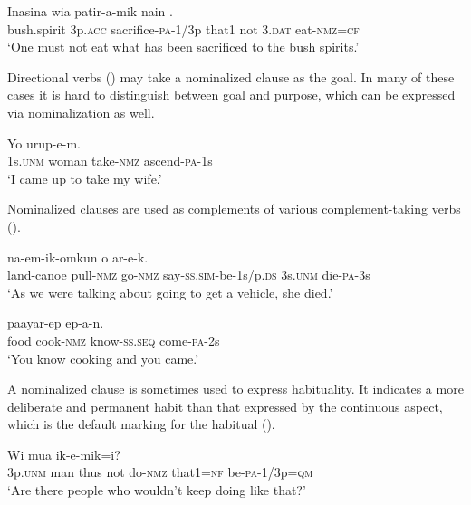 \ea%
\label{ex:5:x1244}
\gll Inasina  wia  patir-a-mik  nain    . \\
     bush.spirit  3p.\textsc{acc}  sacrifice-\textsc{pa}-1/3p  that1  not  3.\textsc{dat} eat-\textsc{nmz}=\textsc{cf} \\
\glt `One must not eat what has been sacrificed to the bush spirits.'
\z

Directional verbs () may take a nominalized clause as the goal. In many of these cases it is hard to distinguish between goal and purpose, which can be expressed via nominalization as well.

\ea%
\label{ex:5:x1245}
\gll Yo     urup-e-m. \\
     1s.\textsc{unm}  woman  take-\textsc{nmz}  ascend-\textsc{pa}-1s \\
\glt `I came up to take my wife.'
\z

Nominalized clauses are used as complements of various complement-taking verbs (). 

\ea%
\label{ex:5:x1246}
\gll {}   na-em-ik-omkun o  ar-e-k. \\
     land-canoe  pull-\textsc{nmz}  go-\textsc{nmz}  say-\textsc{ss}.\textsc{sim}-be-1s/p.\textsc{ds} 3s.\textsc{unm}  die-\textsc{pa}-3s \\
\glt `As we were talking about going to get a vehicle, she died.'
\z

\ea%
\label{ex:5:x1248}
\gll {}   paayar-ep  ep-a-n. \\
     food  cook-\textsc{nmz}  know-\textsc{ss}.\textsc{seq}  come-\textsc{pa}-2s \\
\glt `You know cooking and you came.'
\z

A nominalized clause is sometimes used to express habituality. It indicates a more deliberate and permanent habit than that expressed by the continuous aspect, which is the default marking for the habitual (). 

\ea%
\label{ex:5:x1249}
\gll Wi  mua       ik-e-mik=i? \\
     3p.\textsc{unm}  man  thus  not  do-\textsc{nmz}  that1=\textsc{nf}  be-\textsc{pa}-1/3p=\textsc{qm} \\
\glt `Are there people who wouldn't keep doing like that?'
\z

